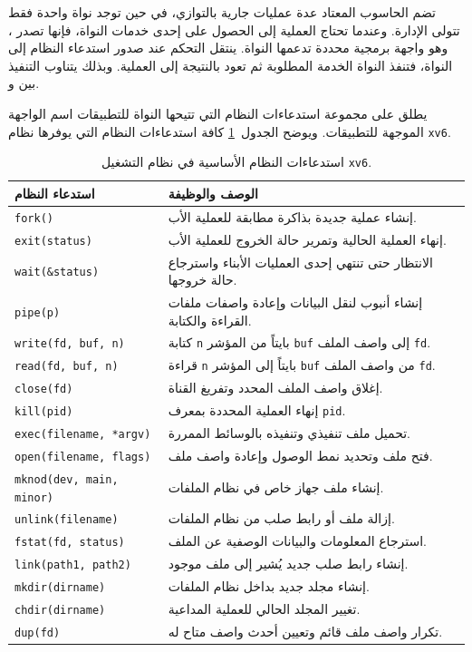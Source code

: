 تضم الحاسوب المعتاد عدة عمليات جارية بالتوازي، في حين توجد نواة واحدة فقط تتولى الإدارة.
وعندما تحتاج العملية إلى الحصول على إحدى خدمات النواة، فإنها تصدر ،
وهو واجهة برمجية محددة تدعمها النواة.
ينتقل التحكم عند صدور استدعاء النظام إلى النواة، فتنفذ النواة الخدمة المطلوبة ثم تعود بالنتيجة إلى العملية.
وبذلك يتناوب التنفيذ بين  و.

يطلق على مجموعة استدعاءات النظام التي تتيحها النواة للتطبيقات اسم الواجهة الموجهة للتطبيقات.
ويوضح الجدول~\ref{t:sys} كافة استدعاءات النظام التي يوفرها نظام \texttt{xv6}.

\begin{table}[t]
\centering
\begin{tabular}{ll}
\toprule
\textbf{استدعاء النظام} & \textbf{الوصف والوظيفة} \\
\midrule
\texttt{fork()} & إنشاء عملية جديدة بذاكرة مطابقة للعملية الأب. \\
\texttt{exit(status)} & إنهاء العملية الحالية وتمرير حالة الخروج للعملية الأب. \\
\texttt{wait(\&status)} & الانتظار حتى تنتهي إحدى العمليات الأبناء واسترجاع حالة خروجها. \\
\texttt{pipe(p)} & إنشاء أنبوب لنقل البيانات وإعادة واصفات ملفات القراءة والكتابة. \\
\texttt{write(fd, buf, n)} & كتابة \texttt{n} بايتاً من المؤشر \texttt{buf} إلى واصف الملف \texttt{fd}. \\
\texttt{read(fd, buf, n)} & قراءة \texttt{n} بايتاً إلى المؤشر \texttt{buf} من واصف الملف \texttt{fd}. \\
\texttt{close(fd)} & إغلاق واصف الملف المحدد وتفريغ القناة. \\
\texttt{kill(pid)} & إنهاء العملية المحددة بمعرف \texttt{pid}. \\
\texttt{exec(filename, *argv)} & تحميل ملف تنفيذي وتنفيذه بالوسائط الممررة. \\
\texttt{open(filename, flags)} & فتح ملف وتحديد نمط الوصول وإعادة واصف ملف. \\
\texttt{mknod(dev, main, minor)} & إنشاء ملف جهاز خاص في نظام الملفات. \\
\texttt{unlink(filename)} & إزالة ملف أو رابط صلب من نظام الملفات. \\
\texttt{fstat(fd, status)} & استرجاع المعلومات والبيانات الوصفية عن الملف. \\
\texttt{link(path1, path2)} & إنشاء رابط صلب جديد يُشير إلى ملف موجود. \\
\texttt{mkdir(dirname)} & إنشاء مجلد جديد بداخل نظام الملفات. \\
\texttt{chdir(dirname)} & تغيير المجلد الحالي للعملية المداعية. \\
\texttt{dup(fd)} & تكرار واصف ملف قائم وتعيين أحدث واصف متاح له. \\
\bottomrule
\end{tabular}
\caption{استدعاءات النظام الأساسية في نظام التشغيل \texttt{xv6}.}
\label{t:sys}
\end{table}

